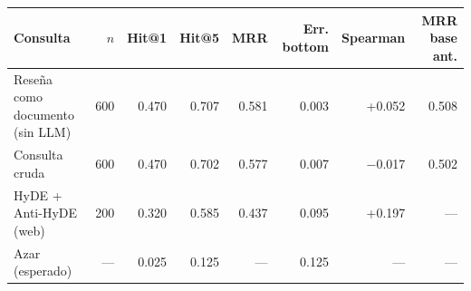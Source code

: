 \begin{tabular}{lrrrrrrr}
\toprule
Consulta & $n$ & Hit@1 & Hit@5 & MRR & Err. bottom & Spearman & MRR base ant. \\
\midrule
Reseña como documento (sin LLM) & 600 & 0.470 & 0.707 & 0.581 & 0.003 & +0.052 & 0.508 \\
Consulta cruda & 600 & 0.470 & 0.702 & 0.577 & 0.007 & $-$0.017 & 0.502 \\
HyDE + Anti-HyDE (web) & 200 & 0.320 & 0.585 & 0.437 & 0.095 & +0.197 & --- \\
Azar (esperado) & --- & 0.025 & 0.125 & --- & 0.125 & --- & --- \\
\bottomrule
\end{tabular}
